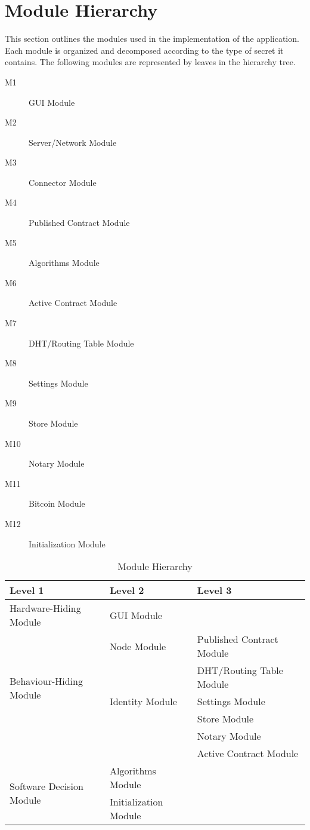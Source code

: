\documentclass{article}
\begin{document}
\section*{Module Hierarchy}
This section outlines the modules used in the implementation of the application. Each module is organized and decomposed according to the type of secret it contains. The following modules are represented by leaves in the hierarchy tree.
\begin{description}
\item[M1]
GUI Module
\item[M2]
Server/Network Module %
\item[M3]
Connector Module %
\item[M4]
Published Contract Module
\item[M5]
Algorithms Module
\item[M6]
Active Contract Module
\item[M7]
DHT/Routing Table Module
\item[M8]
Settings Module
\item[M9]
Store Module
\item[M10]
Notary Module
\item[M11]
Bitcoin Module %
\item[M12]
Initialization Module

\end{description}

\begin{table}[h!]
	\centering
	\begin{tabular}{p{} p{} p{}}
		\toprule
		\textbf{Level 1} & \textbf{Level 2} & \textbf{Level 3}\\
		\midrule
		
		{Hardware-Hiding Module} & GUI Module & ~ \\
		\midrule
		
		\multirow{5}{0.4\textwidth}{Behaviour-Hiding Module} & Node Module & Published Contract Module \\
		& ~ & DHT/Routing Table Module\\
		& Identity Module & Settings Module\\
		& ~ & Store Module\\
		& ~ & Notary Module\\
		& ~ & Active Contract Module\\
		\midrule
		
		\multirow{3}{0.4\textwidth}{Software Decision Module} & Algorithms Module & ~ \\
		& Initialization Module & ~ \\
		\bottomrule
		
	\end{tabular}
	\caption{Module Hierarchy}
	\label{TblMH}
\end{table}
\end{document}
